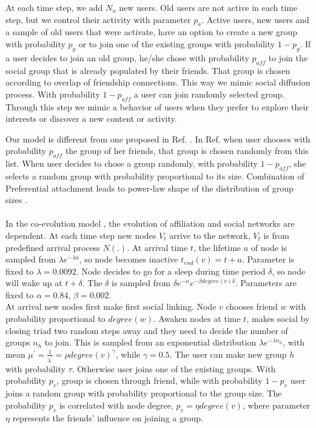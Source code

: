 At each time step, we add $N_{u}$ new users. Old users are not active in each time step, but we control their activity with parameter $p_{a}$. Active users, new users and a sample of old users that were activate, have an option to create a new group with probability $p_{g}$ or to join one of the existing groups with probability $1-p_{g}$. If a user decides to join an old group, he/she chose with probability $p_{aff}$ to join the social group that is already populated by their friends. That group is chosen according to overlap of friendship connections. This way we mimic social diffusion process. With probability $1-p_{aff}$ a user can join randomly selected group. Through this step we mimic a behavior of users when they prefer to explore their interests or discover a new content or activity. 

Our model is different from one proposed in Ref. \cite{zheleva2009co}. In Ref. \cite{zheleva2009co} when user chooses with probability $p_{aff}$ the group of her friends, that group is chosen randomly from this list. When user decides to chose a group randomly, with probability $1-p_{aff}$, she selects a random group with probability proportional to its size. 
Combination of Preferential attachment leads to power-law shape of the distribution of group sizes \cite{zheleva2009co}.
\\~\\
In the co-evolution model \cite{zheleva2009co}, the evolution of affiliation and social networks are dependent. At each time step new nodes $V_t$ arrive to the network, $V_t$ is from predefined arrival process $N(.)$. At arrival time $t$, the lifetime $a$ of node is sampled from $\lambda e^{-\lambda a}$, so node becomes inactive $t_{end}(v) = t+a$. Parameter is fixed to $\lambda = 0.0092$.  Node decides to go for a sleep during time period $\delta$, so node will wake up at $t+\delta$. The $\delta$ is sampled from $\delta e^ {-\alpha} e^{-\beta degree(v) \delta}$. Parameters are fixed to $\alpha=0.84$, $\beta = 0.002$. \\
At arrival new nodes first make first social linking. Node $v$ chooses friend $w$ with probability proportional to $degree(w)$. Awaken nodes at time $t$, makes social by closing triad two random steps away and they need to  decide the number of groups $n_h$ to join. This is sampled from an exponential distribution $\lambda e^ {-\lambda n_h}$, with mean $\mu^{'} = \frac{1}{\lambda ^{'}} = \rho degree(v) ^ \gamma$, while $\gamma=0.5$.
The user can make new group $h$ with probability $\tau$. Otherwise user joins one of the existing groups. With probability $p_v$, group is chosen through friend, while with probability $1-p_v$ user joins a random group with probability proportional to the group size. The probability $p_v$ is correlated with node degree, $p_v=\eta degree(v)$, where parameter $\eta$ represents the friends' influence on joining a group. \\
